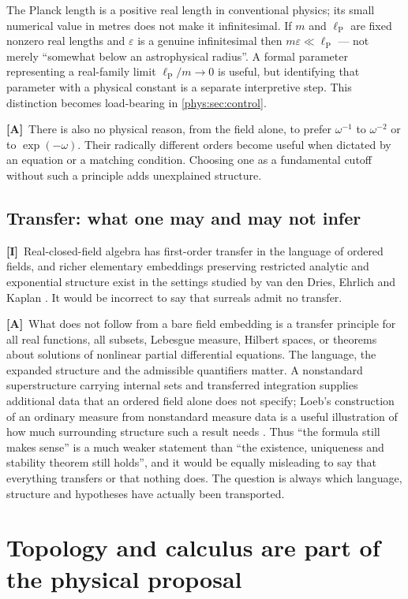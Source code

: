 \documentclass[11pt,letterpaper]{article}
\numberwithin{equation}{section}
\theoremstyle{definition}
\theoremstyle{remark}
\newcommand{\eps}{\varepsilon}
\newcommand{\lP}{\ell_{\mathrm P}}
\newcommand{\TA}{\textcolor{TierA}{\textsf{\bfseries[A]}}}
\newcommand{\TI}{\textcolor{TierI}{\textsf{\bfseries[I]}}}
\begin{document}
The Planck length is a positive real length in conventional physics; its small
numerical value in metres does not make it infinitesimal. If $m$ and $\lP$ are
fixed nonzero real lengths and $\eps$ is a genuine infinitesimal then
$m\eps\ll\lP$ --- not merely ``somewhat below an astrophysical radius''. A
formal parameter representing a real-family limit $\lP/m\to0$ is useful, but
identifying that parameter with a physical constant is a separate interpretive
step. This distinction becomes load-bearing in \cref{phys:sec:control}.

\TA\ There is also no physical reason, from the field alone, to prefer
$\omega^{-1}$ to $\omega^{-2}$ or to $\exp(-\omega)$. Their radically
different orders become useful when dictated by an equation or a matching
condition. Choosing one as a fundamental cutoff without such a principle adds
unexplained structure.

\subsection{Transfer: what one may and may not infer}
\label{phys:sub:transfer}

\TI\ Real-closed-field algebra has first-order transfer in the language of
ordered fields, and richer elementary embeddings preserving restricted analytic
and exponential structure exist in the settings studied by van den Dries,
Ehrlich and Kaplan \cite{phys:vdDE,phys:EK,phys:Ehrlich}. It would be incorrect
to say that surreals admit no transfer.

\TA\ What does not follow from a bare field embedding is a transfer principle
for all real functions, all subsets, Lebesgue measure, Hilbert spaces, or
theorems about solutions of nonlinear partial differential equations. The
language, the expanded structure and the admissible quantifiers matter. A
nonstandard superstructure carrying internal sets and transferred integration
supplies additional data that an ordered field alone does not specify; Loeb's
construction of an ordinary measure from nonstandard measure data is a useful
illustration of how much surrounding structure such a result needs
\cite{phys:Loeb}. Thus ``the formula still makes sense'' is a much weaker
statement than ``the existence, uniqueness and stability theorem still holds'',
and it would be equally misleading to say that everything transfers or that
nothing does. The question is always which language, structure and hypotheses
have actually been transported.

\section{Topology and calculus are part of the physical proposal}
\label{phys:sec:calculus}
\end{document}
